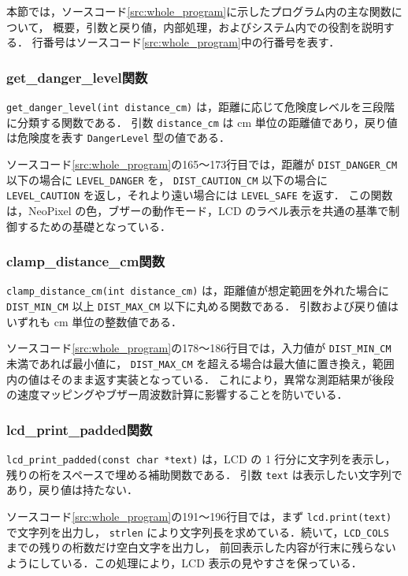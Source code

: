 \documentclass[a4paper,fontsize=11pt,line_length=40zw,number_of_lines=35,baselineskip=1.7zw]{jlreq}
\begin{document}
本節では，ソースコード\ref{src:whole_program}に示したプログラム内の主な関数について，
概要，引数と戻り値，内部処理，およびシステム内での役割を説明する．
行番号はソースコード\ref{src:whole_program}中の行番号を表す．

\subsubsection{get\_danger\_level関数}

\lstinline|get_danger_level(int distance_cm)| は，距離に応じて危険度レベルを三段階に分類する関数である．
引数 \lstinline|distance_cm| は cm 単位の距離値であり，戻り値は危険度を表す \lstinline|DangerLevel| 型の値である．

ソースコード\ref{src:whole_program}の165〜173行目では，距離が \lstinline|DIST_DANGER_CM| 以下の場合に \lstinline|LEVEL_DANGER| を，
\lstinline|DIST_CAUTION_CM| 以下の場合に \lstinline|LEVEL_CAUTION| を返し，それより遠い場合には \lstinline|LEVEL_SAFE| を返す．
この関数は，NeoPixel の色，ブザーの動作モード，LCD のラベル表示を共通の基準で制御するための基礎となっている．

\subsubsection{clamp\_distance\_cm関数}

\lstinline|clamp_distance_cm(int distance_cm)| は，距離値が想定範囲を外れた場合に \lstinline|DIST_MIN_CM| 以上 \lstinline|DIST_MAX_CM| 以下に丸める関数である．
引数および戻り値はいずれも cm 単位の整数値である．

ソースコード\ref{src:whole_program}の178〜186行目では，入力値が \lstinline|DIST_MIN_CM| 未満であれば最小値に，
\lstinline|DIST_MAX_CM| を超える場合は最大値に置き換え，範囲内の値はそのまま返す実装となっている．
これにより，異常な測距結果が後段の速度マッピングやブザー周波数計算に影響することを防いでいる．

\subsubsection{lcd\_print\_padded関数}

\lstinline|lcd_print_padded(const char *text)| は，LCD の 1 行分に文字列を表示し，残りの桁をスペースで埋める補助関数である．
引数 \lstinline|text| は表示したい文字列であり，戻り値は持たない．

ソースコード\ref{src:whole_program}の191〜196行目では，まず \lstinline|lcd.print(text)| で文字列を出力し，
\lstinline|strlen| により文字列長を求めている．続いて，\lstinline|LCD_COLS| までの残りの桁数だけ空白文字を出力し，
前回表示した内容が行末に残らないようにしている．この処理により，LCD 表示の見やすさを保っている．
\end{document}
